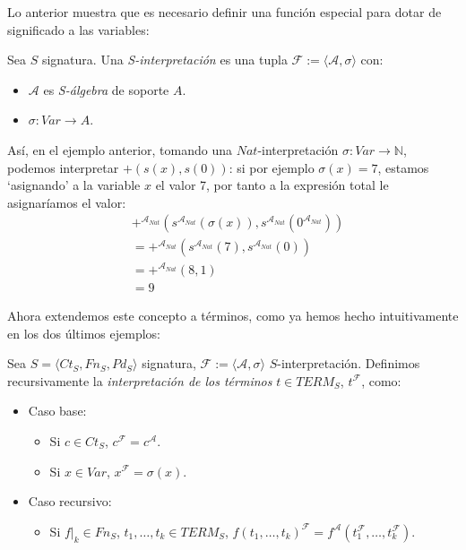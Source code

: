 Lo anterior muestra que es necesario definir una función especial para dotar de significado a las variables:

\begin{definition}
Sea $S$ signatura. Una \textit{S-interpretación} es una tupla $\mathcal{F} := \langle \mathcal{A}, \sigma \rangle$ con:
\begin{itemize}
    \item $\mathcal{A}$ es \textit{S-álgebra} de soporte $A$.
    \item $\sigma : Var \rightarrow A$.
\end{itemize}
\end{definition}

\begin{example}
Así, en el ejemplo anterior, tomando una $Nat$-interpretación $\sigma: Var \rightarrow \mathbb{N}$, podemos interpretar $+(s(x), s(0))$: si por ejemplo $\sigma(x) = 7$, estamos `asignando' a la variable $x$ el valor 7, por tanto a la expresión total le asignaríamos el valor:
\begin{align*}
&+^{\mathcal{A}_{Nat}}(s^{\mathcal{A}_{Nat}}(\sigma(x)), s^{\mathcal{A}_{Nat}}(0^{\mathcal{A}_{Nat}}))\\
&=+^{\mathcal{A}_{Nat}}(s^{\mathcal{A}_{Nat}}(7), s^{\mathcal{A}_{Nat}}(0))\\
&=+^{\mathcal{A}_{Nat}}(8,1)\\
&=9
\end{align*}
\end{example}

Ahora extendemos este concepto a términos, como ya hemos hecho intuitivamente en los dos últimos ejemplos:

\begin{definition}
Sea $S = \langle Ct_{S}, Fn_{S}, Pd_{S}\rangle$ signatura, $\mathcal{F} := \langle \mathcal{A}, \sigma \rangle$ $S$-interpretación. Definimos recursivamente la \textit{interpretación de los términos} $t \in TERM_S$, $t^{\mathcal{F}}$, como:
\begin{itemize}
    \item Caso base:
        \begin{itemize}
            \item Si $c \in Ct_S$, $c^{\mathcal{F}} = c^{\mathcal{A}}$.
            \item Si $x \in Var$, $x^{\mathcal{F}} = \sigma(x)$.
        \end{itemize}
    \item Caso recursivo:
        \begin{itemize}
           \item Si $f|_k \in Fn_S$, $t_1, \dots, t_k \in TERM_S$, $f(t_1, \dots, t_k)^{\mathcal{F}} = f^{\mathcal{A}}(t_{1}^{\mathcal{F}}, \dots, t_{k}^{\mathcal{F}})$.
        \end{itemize}
\end{itemize}
\end{definition}

